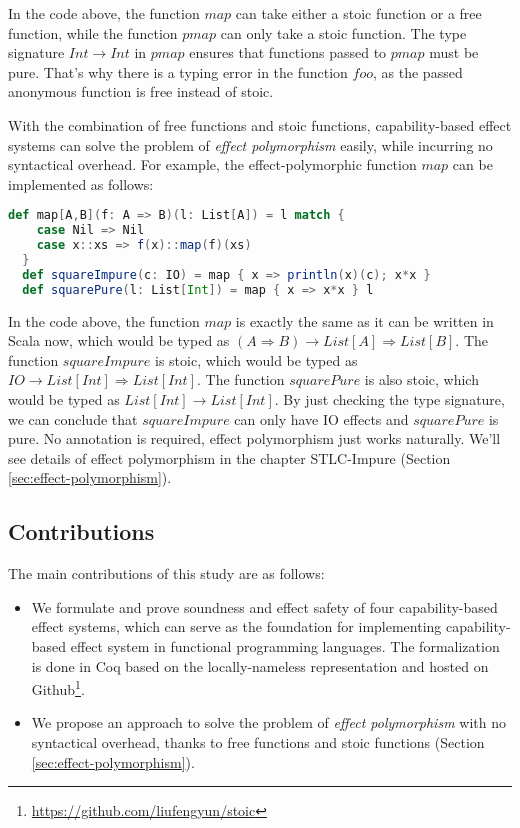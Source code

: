 In the code above, the function $map$ can take either a stoic
function or a free function, while the function $pmap$ can only
take a stoic function. The type signature $Int \to Int$ in $pmap$
ensures that functions passed to $pmap$ must be pure. That's why
there is a typing error in the function $foo$, as the passed
anonymous function is free instead of stoic.

With the combination of free functions and stoic functions,
capability-based effect systems can solve the problem of \emph{effect
  polymorphism} easily, while incurring no syntactical overhead. For
example, the effect-polymorphic function $map$ can be implemented as
follows:

\begin{lstlisting}[language=Scala]
  def map[A,B](f: A => B)(l: List[A]) = l match {
    case Nil => Nil
    case x::xs => f(x)::map(f)(xs)
  }
  def squareImpure(c: IO) = map { x => println(x)(c); x*x }
  def squarePure(l: List[Int]) = map { x => x*x } l
\end{lstlisting}

In the code above, the function $map$ is exactly the same as it can be
written in Scala now, which would be typed as
$(A \Rightarrow B) \to List[A] \Rightarrow List[B]$. The function
$squareImpure$ is stoic, which would be typed as
$IO \to List[Int] \Rightarrow List[Int]$. The function $squarePure$ is
also stoic, which would be typed as $List[Int] \to List[Int]$. By just
checking the type signature, we can conclude that $squareImpure$ can
only have IO effects and $squarePure$ is pure. No annotation is
required, effect polymorphism just works naturally. We'll see details
of effect polymorphism in the chapter STLC-Impure (Section
\ref{sec:effect-polymorphism}).

\subsection{Contributions}

The main contributions of this study are as follows:

\begin{itemize}
\item We formulate and prove soundness and effect safety of four
  capability-based effect systems, which can serve as the foundation
  for implementing capability-based effect system in functional
  programming languages. The formalization is done in Coq based on the
  locally-nameless representation\cite{chargueraud-11-ln} and hosted
  on Github\footnote{\url{https://github.com/liufengyun/stoic}}.
\item We propose an approach to solve the problem of \emph{effect
    polymorphism} with no syntactical overhead, thanks to free
  functions and stoic functions (Section
  \ref{sec:effect-polymorphism}).
\end{itemize}

